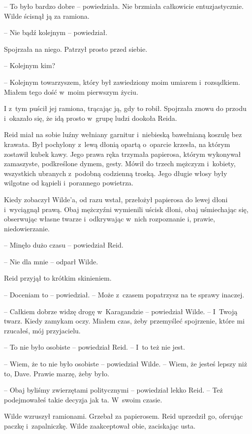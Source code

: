 \documentclass[oneside,polish,11pt,sfheadings]{mwbk}
\begin{document}
-- To było bardzo dobre -- powiedziała. Nie brzmiała całkowicie
entuzjastycznie. Wilde ścisnął ją za ramiona.

-- Nie bądź kolejnym -- powiedział.

Spojrzała na niego. Patrzył prosto przed siebie.

-- Kolejnym kim?

-- Kolejnym towarzyszem, który był zawiedziony moim umiarem i~rozsądkiem.
Miałem tego dość w~moim pierwszym życiu.

I z~tym puścił jej ramiona, trącając ją, gdy to robił. Spojrzała znowu
do przodu i~okazało się, że idą prosto w~grupę ludzi dookoła Reida.

Reid miał na sobie luźny wełniany garnitur i~niebieską bawełnianą
koszulę bez krawata. Był pochylony z~lewą dłonią opartą o~oparcie
krzesła, na którym zostawił kubek kawy. Jego prawa ręka trzymała
papierosa, którym wykonywał zamaszyste, podkreślone dymem, gesty. Mówił
do trzech mężczyzn i~kobiety, wszystkich ubranych z~podobną codzienną
troską. Jego długie włosy były wilgotne od kąpieli i~porannego
powietrza.

Kiedy zobaczył Wilde'a, od razu wstał, przełożył papierosa do lewej
dłoni i~wyciągnął prawą. Obaj mężczyźni wymienili uścisk dłoni, obaj
uśmiechając się, obserwując własne twarze i~odkrywając w~nich
rozpoznanie i, prawie, niedowierzanie.

-- Minęło dużo czasu -- powiedział Reid.

-- Nie dla mnie -- odparł Wilde.

Reid przyjął to krótkim skinieniem.

-- Doceniam to -- powiedział. -- Może z~czasem popatrzysz na te sprawy
inaczej.

-- Całkiem dobrze widzę drogę w~Karagandzie -- powiedział Wilde. -- I~Twoją
twarz. Kiedy zamykam oczy. Miałem czas, żeby przemyśleć spojrzenie,
które mi rzucałeś, mój przyjacielu.

-- To nie było osobiste -- powiedział Reid. -- I~to też nie jest.

-- Wiem, że to nie było osobiste -- powiedział Wilde. -- Wiem, że jesteś
lepszy niż to, Dave. Prawie marzę, żeby było.

-- Obaj byliśmy zwierzętami politycznymi -- powiedział lekko Reid. -- Też
podejmowałeś takie decyzja jak ta. W~swoim czasie.

Wilde wzruszył ramionami. Grzebał za papierosem. Reid uprzedził go,
oferując paczkę i~zapalniczkę. Wilde zaakceptował obie, zaciskając usta.
\end{document}
